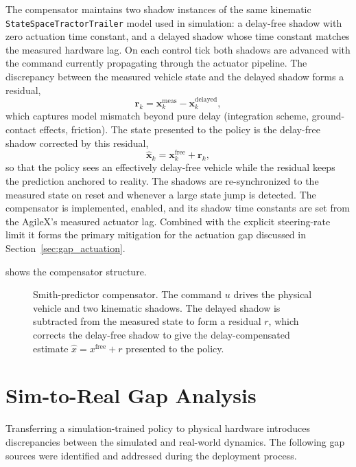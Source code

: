The compensator maintains two shadow instances of the same kinematic \texttt{StateSpace\allowbreak TractorTrailer} model used in simulation: a delay-free shadow with zero actuation time constant, and a delayed shadow whose time constant matches the measured hardware lag. On each control tick both shadows are advanced with the command currently propagating through the actuator pipeline. The discrepancy between the measured vehicle state and the delayed shadow forms a residual,
\begin{equation}
    \mathbf{r}_k = \mathbf{x}^\text{meas}_k - \mathbf{x}^\text{delayed}_k,
    \label{eq:smith_residual}
\end{equation}
which captures model mismatch beyond pure delay (integration scheme, ground-contact effects, friction). The state presented to the policy is the delay-free shadow corrected by this residual,
\begin{equation}
    \hat{\mathbf{x}}_k = \mathbf{x}^\text{free}_k + \mathbf{r}_k,
    \label{eq:smith_predict}
\end{equation}
so that the policy sees an effectively delay-free vehicle while the residual keeps the prediction anchored to reality. The shadows are re-synchronized to the measured state on reset and whenever a large state jump is detected. The compensator is implemented, enabled, and its shadow time constants are set from the AgileX's measured actuator lag. Combined with the explicit steering-rate limit it forms the primary mitigation for the actuation gap discussed in Section~\ref{sec:gap_actuation}.

 shows the compensator structure.

\begin{figure}[t]
  \centering
  
  \caption{Smith-predictor compensator. The command $u$ drives the physical vehicle and two kinematic shadows. The delayed shadow is subtracted from the measured state to form a residual $r$, which corrects the delay-free shadow to give the delay-compensated estimate $\hat{x} = x^{\mathrm{free}} + r$ presented to the policy.}
  \label{fig:smith_predictor}
\end{figure}


\section{Sim-to-Real Gap Analysis}

Transferring a simulation-trained policy to physical hardware introduces discrepancies between the simulated and real-world dynamics. The following gap sources were identified and addressed during the deployment process.

